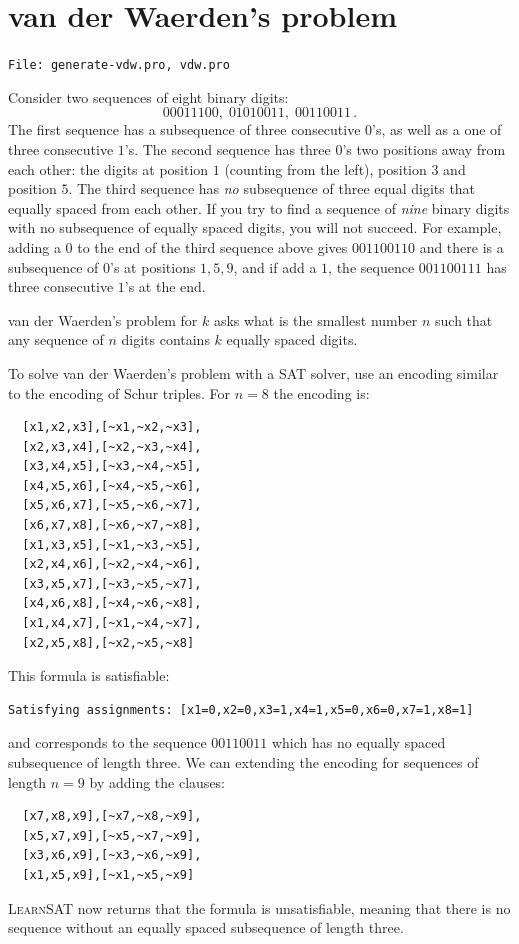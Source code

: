 \documentclass[11pt]{report}
\newcommand*{\p}[1]{\textup{\texttt{#1}}}
\newcommand*{\ls}{\textsc{LearnSAT}}
\newcommand*{\fl}[1]{\parbox{\textwidth}{\raggedleft \p{File: #1}}}
\begin{document}
\section{van der Waerden's problem}

\fl{generate-vdw.pro, vdw.pro}

Consider two sequences of eight binary digits:
\[
00011100,\; 01010011,\; 00110011\,.
\]
The first sequence has a subsequence of three consecutive $0$'s, as well as a one of three consecutive $1$'s. The second sequence has three $0$'s two positions away from each other: the digits at position $1$ (counting from the left), position $3$ and position $5$. The third sequence has \emph{no} subsequence of three equal digits that equally spaced from each other. If you try to find a sequence of \emph{nine} binary digits with no subsequence of equally spaced digits, you will not succeed. For example, adding a $0$ to the end of the third sequence above gives $001100110$ and there is a subsequence of $0$'s at positions $1,5,9$, and if add a $1$, the sequence $001100111$ has three consecutive $1$'s at the end.

van der Waerden's problem for $k$ asks what is the smallest number $n$ such that any sequence of $n$ digits contains $k$ equally spaced digits.

To solve van der Waerden's problem with a SAT solver, use an encoding similar to the encoding of Schur triples. For $n=8$ the encoding is:
\begin{verbatim}
  [x1,x2,x3],[~x1,~x2,~x3],
  [x2,x3,x4],[~x2,~x3,~x4],
  [x3,x4,x5],[~x3,~x4,~x5],
  [x4,x5,x6],[~x4,~x5,~x6],
  [x5,x6,x7],[~x5,~x6,~x7],
  [x6,x7,x8],[~x6,~x7,~x8],
  [x1,x3,x5],[~x1,~x3,~x5],
  [x2,x4,x6],[~x2,~x4,~x6],
  [x3,x5,x7],[~x3,~x5,~x7],
  [x4,x6,x8],[~x4,~x6,~x8],
  [x1,x4,x7],[~x1,~x4,~x7],
  [x2,x5,x8],[~x2,~x5,~x8]
\end{verbatim}
This formula is satisfiable:
\begin{verbatim}
Satisfying assignments: [x1=0,x2=0,x3=1,x4=1,x5=0,x6=0,x7=1,x8=1]
\end{verbatim}
and corresponds to the sequence $00110011$ which has no equally spaced subsequence of length three. We can extending the encoding for sequences of length $n=9$ by adding the clauses:
\begin{verbatim}
  [x7,x8,x9],[~x7,~x8,~x9],
  [x5,x7,x9],[~x5,~x7,~x9],
  [x3,x6,x9],[~x3,~x6,~x9],
  [x1,x5,x9],[~x1,~x5,~x9]
\end{verbatim}
\ls{} now returns that the formula is unsatisfiable, meaning that there is no sequence without an equally spaced subsequence of length three.
\end{document}

